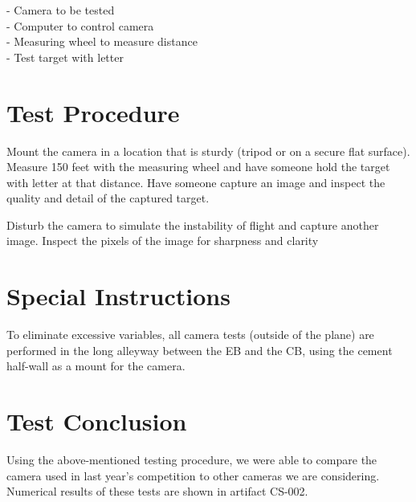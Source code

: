\documentclass[]{auvsi_doc}
\begin{document}
- Camera to be tested\\
- Computer to control camera\\
- Measuring wheel to measure distance\\
- Test target with letter

\section{Test Procedure}
Mount the camera in a location that is sturdy (tripod or on a secure flat surface). Measure 150 feet with the measuring wheel and have someone hold the target with letter at that distance. Have someone capture an image and inspect the quality and detail of the captured target.

Disturb the camera to simulate the instability of flight and capture another image. Inspect the pixels of the image for sharpness and clarity

\section{Special Instructions}

To eliminate excessive variables, all camera tests (outside of the plane) are performed in the long alleyway between the EB and the CB, using the cement half-wall as a mount for the camera.

\section{Test Conclusion}

Using the above-mentioned testing procedure, we were able to compare the camera used in last year's competition to other cameras we are considering. Numerical results of these tests are shown in artifact CS-002.
\end{document}

